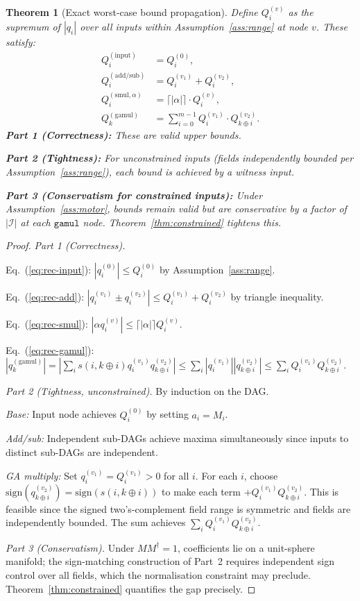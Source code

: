 \documentclass[11pt,a4paper]{article}
\theoremstyle{definition}
\theoremstyle{plain}
\newtheorem{theorem}{Theorem}[section]
\theoremstyle{remark}
\begin{document}
\begin{theorem}[Exact worst-case bound propagation]
\label{thm:growth}
Define $Q_i^{(v)}$ as the supremum of $|q_i|$ over all inputs within
Assumption~\ref{ass:range} at node $v$.
These satisfy:
\begin{align}
  Q_i^{(\mathrm{input})} &= Q_i^{(0)},\label{eq:rec-input}\\
  Q_i^{(\mathrm{add/sub})} &= Q_i^{(v_1)}+Q_i^{(v_2)},\label{eq:rec-add}\\
  Q_i^{(\mathrm{smul},\alpha)} &= \lceil|\alpha|\rceil\cdot Q_i^{(v)},\label{eq:rec-smul}\\
  Q_k^{(\mathrm{gamul})} &= \sum_{i=0}^{m-1}Q_i^{(v_1)}\cdot Q_{k\oplus i}^{(v_2)}.\label{eq:rec-gamul}
\end{align}
\textbf{Part 1 (Correctness):} These are valid upper bounds.

\textbf{Part 2 (Tightness):}
For unconstrained inputs (fields independently bounded per
Assumption~\ref{ass:range}), each bound is achieved by a witness input.

\textbf{Part 3 (Conservatism for constrained inputs):}
Under Assumption~\ref{ass:motor}, bounds remain valid but are conservative
by a factor of $|\mathcal{I}|$ at each $\mathtt{gamul}$ node.
Theorem~\ref{thm:constrained} tightens this.
\end{theorem}

\begin{proof}
\textit{Part 1 (Correctness).}

Eq.~(\ref{eq:rec-input}): $|q_i^{(0)}|\le Q_i^{(0)}$ by Assumption~\ref{ass:range}.

Eq.~(\ref{eq:rec-add}): $|q_i^{(v_1)}\pm q_i^{(v_2)}|\le Q_i^{(v_1)}+Q_i^{(v_2)}$ by triangle inequality.

Eq.~(\ref{eq:rec-smul}): $|\alpha q_i^{(v)}|\le\lceil|\alpha|\rceil Q_i^{(v)}$.

Eq.~(\ref{eq:rec-gamul}):
$|q_k^{(\mathrm{gamul})}|
=|\sum_i s(i,k\oplus i)q_i^{(v_1)}q_{k\oplus i}^{(v_2)}|
\le\sum_i|q_i^{(v_1)}||q_{k\oplus i}^{(v_2)}|
\le\sum_i Q_i^{(v_1)}Q_{k\oplus i}^{(v_2)}.$

\textit{Part 2 (Tightness, unconstrained).}
By induction on the DAG.

\emph{Base:} Input node achieves $Q_i^{(0)}$ by setting $a_i=M_i$.

\emph{Add/sub:} Independent sub-DAGs achieve maxima simultaneously since
inputs to distinct sub-DAGs are independent.

\emph{GA multiply:} Set $q_i^{(v_1)}=Q_i^{(v_1)}>0$ for all $i$.
For each $i$, choose $\text{sign}(q_{k\oplus i}^{(v_2)})=\text{sign}(s(i,k\oplus i))$
to make each term $+Q_i^{(v_1)}Q_{k\oplus i}^{(v_2)}$.
This is feasible since the signed two's-complement field range is symmetric
and fields are independently bounded.
The sum achieves $\sum_i Q_i^{(v_1)}Q_{k\oplus i}^{(v_2)}$.

\textit{Part 3 (Conservatism).}
Under $MM^\dagger=1$, coefficients lie on a unit-sphere manifold; the
sign-matching construction of Part~2 requires independent sign control
over all fields, which the normalisation constraint may preclude.
Theorem~\ref{thm:constrained} quantifies the gap precisely.
\end{proof}
\end{document}
